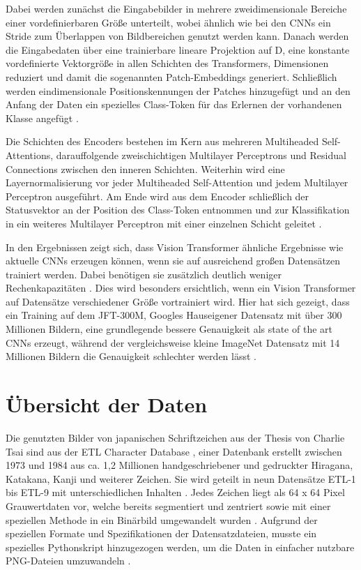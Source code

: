 \documentclass[twoside,a4paper]{IEEEtran}
\begin{document}
Dabei werden zunächst die Eingabebilder in mehrere zweidimensionale Bereiche einer vordefinierbaren Größe unterteilt, wobei ähnlich wie bei den CNNs ein Stride zum Überlappen von Bildbereichen genutzt werden kann. Danach werden die Eingabedaten über eine trainierbare lineare Projektion auf D, eine konstante vordefinierte Vektorgröße in allen Schichten des Transformers, Dimensionen reduziert und damit die sogenannten Patch-Embeddings generiert. Schließlich werden eindimensionale Positionskennungen der Patches hinzugefügt und an den Anfang der Daten ein spezielles Class-Token für das Erlernen der vorhandenen Klasse angefügt  \cite[S.3]{VIT}. 

Die Schichten des Encoders bestehen im Kern aus mehreren Multiheaded Self-Attentions, darauffolgende zweischichtigen Multilayer Perceptrons und Residual Connections zwischen den inneren Schichten. Weiterhin wird eine Layernormalisierung vor jeder Multiheaded Self-Attention und jedem Multilayer Perceptron ausgeführt. Am Ende wird aus dem Encoder schließlich der Statusvektor an der Position des Class-Token entnommen und zur Klassifikation in ein weiteres Multilayer Perceptron mit einer einzelnen Schicht geleitet \cite[S.3-4]{VIT}. 

In den Ergebnissen zeigt sich, dass Vision Transformer ähnliche Ergebnisse wie aktuelle CNNs erzeugen können, wenn sie auf ausreichend großen Datensätzen trainiert werden. Dabei benötigen sie zusätzlich deutlich weniger Rechenkapazitäten \cite[S.5]{VIT}. Dies wird besonders ersichtlich, wenn ein Vision Transformer auf Datensätze verschiedener Größe vortrainiert wird. Hier hat sich gezeigt, dass ein Training auf dem JFT-300M, Googles Hauseigener Datensatz mit über 300 Millionen Bildern, eine grundlegende bessere Genauigkeit als state of the art CNNs erzeugt, während der vergleichsweise kleine ImageNet Datensatz mit 14 Millionen Bildern \cite{IMAGENET} die Genauigkeit schlechter werden lässt \cite{JFT}.
\section{Übersicht der Daten} %
Die genutzten Bilder von japanischen Schriftzeichen aus der Thesis von Charlie Tsai sind aus der ETL Character Database \cite[S.2-3]{RHC}, einer Datenbank erstellt zwischen 1973 und 1984 aus ca. 1,2 Millionen handgeschriebener und gedruckter Hiragana, Katakana, Kanji und weiterer Zeichen. Sie wird geteilt in neun Datensätze ETL-1 bis ETL-9 mit unterschiedlichen Inhalten \cite{ETL}. Jedes Zeichen liegt als 64 x 64 Pixel Grauwertdaten vor, welche bereits segmentiert und zentriert sowie mit einer speziellen Methode in ein Binärbild umgewandelt wurden \cite[S.3]{RHC}. Aufgrund der speziellen Formate und Spezifikationen der Datensatzdateien, musste ein spezielles Pythonskript hinzugezogen werden, um die Daten in einfacher nutzbare PNG-Dateien umzuwandeln \cite{ETL_FORMATS}. 
\end{document}
